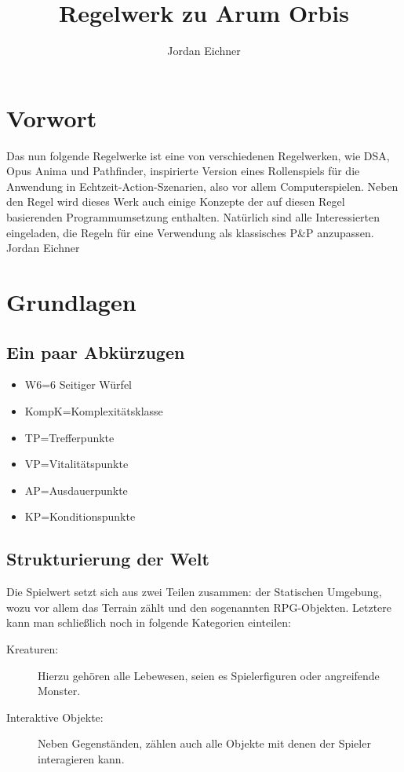 \documentclass[a4paper,12pt,oneside]{book}
\author{Jordan Eichner}
\title{Regelwerk zu Arum Orbis}
\date{}
\begin{document}
\maketitle
\part*{Vorwort}
Das nun folgende Regelwerke ist eine von verschiedenen Regelwerken, wie DSA, Opus Anima und Pathfinder, inspirierte Version eines Rollenspiels für die Anwendung in Echtzeit-Action-Szenarien, also vor allem Computerspielen. Neben den Regel wird dieses Werk auch einige Konzepte der auf diesen Regel basierenden Programmumsetzung enthalten. Natürlich sind alle Interessierten eingeladen, die Regeln für eine Verwendung als klassisches P\&P anzupassen.
Jordan Eichner

\tableofcontents
  
\part{Grundlagen}
\chapter{Ein paar Abkürzugen}
\begin{itemize}
\item W6=6 Seitiger Würfel
\item KompK=Komplexitätsklasse
\item TP=Trefferpunkte
\item VP=Vitalitätspunkte
\item AP=Ausdauerpunkte
\item KP=Konditionspunkte

\end{itemize}

\chapter{Strukturierung der Welt}
Die Spielwert setzt sich aus zwei Teilen zusammen: der Statischen Umgebung, wozu vor allem das Terrain zählt und den sogenannten RPG-Objekten. Letztere kann man schließlich noch in folgende Kategorien einteilen:
\begin{description}
\item[Kreaturen:]
Hierzu gehören alle Lebewesen, seien es Spielerfiguren oder angreifende Monster.
\item[Interaktive Objekte:]
Neben Gegenständen, zählen auch alle Objekte mit denen der Spieler interagieren kann.
\end{description}
\end{document}
